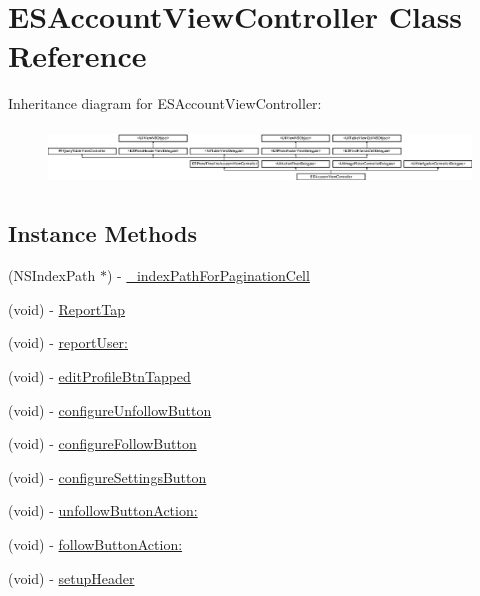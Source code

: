 \hypertarget{interface_e_s_account_view_controller}{}\section{E\+S\+Account\+View\+Controller Class Reference}
\label{interface_e_s_account_view_controller}
Inheritance diagram for E\+S\+Account\+View\+Controller\+:\begin{figure}[H]
\begin{center}
\leavevmode
\includegraphics[height=1.523810cm]{interface_e_s_account_view_controller}
\end{center}
\end{figure}
\subsection*{Instance Methods}
\begin{DoxyCompactItemize}
\item 
(N\+S\+Index\+Path $\ast$) -\/ \hyperlink{interface_e_s_account_view_controller_a6cdc8bed85236557832c266e2779d097}{\+\_\+index\+Path\+For\+Pagination\+Cell}
\item 
(void) -\/ \hyperlink{interface_e_s_account_view_controller_a3a10bdbf575483d8da1c021b36f353c2}{Report\+Tap}
\item 
(void) -\/ \hyperlink{interface_e_s_account_view_controller_a5af71ac1b0e8cced3ee25dd832a721dd}{report\+User\+:}
\item 
(void) -\/ \hyperlink{interface_e_s_account_view_controller_a1f349a08f20401c5170185b7042279d1}{edit\+Profile\+Btn\+Tapped}
\item 
(void) -\/ \hyperlink{interface_e_s_account_view_controller_a8468dc5bea0c74b060b4d12e3f2ff921}{configure\+Unfollow\+Button}
\item 
(void) -\/ \hyperlink{interface_e_s_account_view_controller_a67a7b627711e3952e39e760832c70999}{configure\+Follow\+Button}
\item 
(void) -\/ \hyperlink{interface_e_s_account_view_controller_a7531b3758ba84e05995801673cbc8c81}{configure\+Settings\+Button}
\item 
(void) -\/ \hyperlink{interface_e_s_account_view_controller_ab8f14d3a4fa5fdd034a188449b95a9d0}{unfollow\+Button\+Action\+:}
\item 
(void) -\/ \hyperlink{interface_e_s_account_view_controller_ae704e047e27e00db5fdf89093bcb329f}{follow\+Button\+Action\+:}
\item 
(void) -\/ \hyperlink{interface_e_s_account_view_controller_a2153b7d9ea94d5b54490a6a21c4e6ba4}{setup\+Header}
\end{DoxyCompactItemize}
